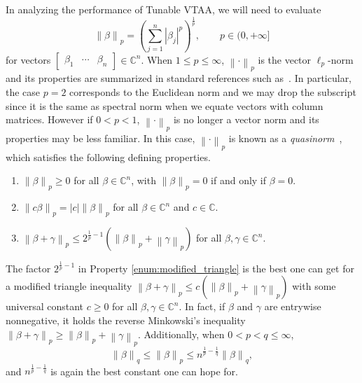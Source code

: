 \documentclass[letterpaper,onecolumn,11pt,accepted=2026-02-14]{quantumarticle}
\newcommand{\abs}[1]{\left\lvert#1\right\rvert}
\newcommand{\norm}[1]{\left\lVert#1\right\rVert}
\theoremstyle{remark}
\theoremstyle{plain}
\begin{document}
In analyzing the performance of Tunable VTAA, we will need to evaluate
\begin{equation}
    \norm{\beta}_{p}=\left(\sum_{j=1}^n\abs{\beta_j}^p\right)^{\frac{1}{p}},\qquad
    p\in(0,+\infty]
\end{equation}
for vectors $\begin{bmatrix}
    \beta_1 & \cdots & \beta_n
\end{bmatrix}\in\mathbb{C}^n$. When $1\leq p\leq\infty$, $\norm{\cdot}_p$ is the vector $\ell_p$-norm and its properties are summarized in standard references such as~\cite[Chapter 5]{horn2012matrix}. In particular, the case $p=2$ corresponds to the Euclidean norm and we may drop the subscript since it is the same as spectral norm when we equate vectors with column matrices. However if $0<p<1$, $\norm{\cdot}_p$ is no longer a vector norm and its properties may be less familiar. In this case, $\norm{\cdot}_p$ is known as a \emph{quasinorm}~\cite{Rosenzweig,Conrad}, which satisfies the following defining properties.
\begin{enumerate}[label=(\roman*)]
\item \label{enum:positivity} $\norm{\beta}_p\geq0$ for all $\beta\in\mathbb{C}^n$, with $\norm{\beta}_p=0$ if and only if $\beta=0$.
\item \label{enum:homogeneity} $\norm{c\beta}_p=\abs{c}\norm{\beta}_p$ for all $\beta\in\mathbb{C}^n$ and $c\in\mathbb{C}$.
\item \label{enum:modified_triangle} $\norm{\beta+\gamma}_p\leq2^{\frac{1}{p}-1}\left(\norm{\beta}_p+\norm{\gamma}_p\right)$ for all $\beta,\gamma\in\mathbb{C}^n$.
\end{enumerate}
The factor $2^{\frac{1}{p}-1}$ in Property \ref{enum:modified_triangle} is the best one can get for a modified triangle inequality $\norm{\beta+\gamma}_p\leq c\left(\norm{\beta}_p+\norm{\gamma}_p\right)$ with some universal constant $c\geq0$ for all $\beta,\gamma\in\mathbb{C}^n$. In fact, if $\beta$ and $\gamma$ are entrywise nonnegative, it holds the reverse Minkowski's inequality $\norm{\beta+\gamma}_p\geq\norm{\beta}_p+\norm{\gamma}_p$. Additionally, when $0<p<q\leq\infty$,
\begin{equation}
    \norm{\beta}_q\leq\norm{\beta}_p\leq n^{\frac{1}{p}-\frac{1}{q}}\norm{\beta}_q,
\end{equation}
and $n^{\frac{1}{p}-\frac{1}{q}}$ is again the best constant one can hope for.
\end{document}
